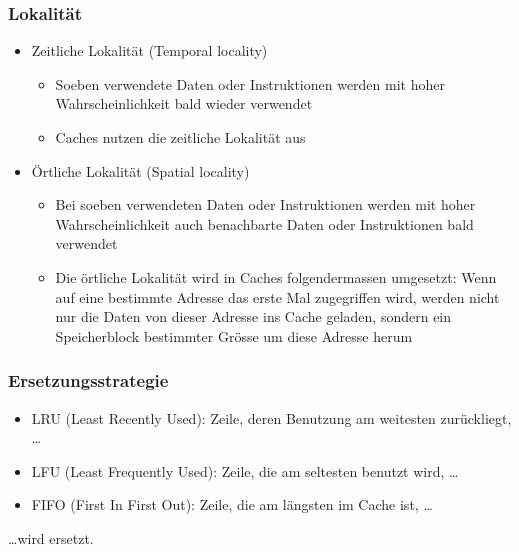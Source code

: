 \subsubsection{Lokalität}
\begin{minipage}[t]{6cm}
	\begin{itemize}
		\item Zeitliche Lokalität (Temporal locality)
		\begin{itemize}
			\item Soeben verwendete Daten oder Instruktionen werden mit hoher Wahrscheinlichkeit bald wieder verwendet
			\item Caches nutzen die zeitliche Lokalität aus
		\end{itemize}
	\end{itemize}
\end{minipage}
\begin{minipage}[t]{13cm}
	\begin{itemize}
		\item Örtliche Lokalität (Spatial locality)
		\begin{itemize}
			\item Bei soeben verwendeten Daten oder Instruktionen werden mit hoher Wahrscheinlichkeit auch benachbarte Daten oder Instruktionen bald verwendet
			\item Die örtliche Lokalität wird in Caches folgendermassen umgesetzt: Wenn auf eine bestimmte Adresse das erste Mal zugegriffen wird, werden nicht nur die Daten von dieser Adresse ins Cache geladen, sondern ein Speicherblock bestimmter Grösse um diese Adresse herum
		\end{itemize}
	\end{itemize}
\end{minipage}
\subsubsection{Ersetzungsstrategie}
\begin{itemize}
	\item LRU (Least Recently Used): Zeile, deren Benutzung am weitesten zur\"uckliegt, \ldots
	\item LFU (Least Frequently Used): Zeile, die am seltesten benutzt wird, \ldots
	\item FIFO (First In First Out): Zeile, die am längsten im Cache ist, \ldots
\end{itemize}
\ldots wird ersetzt.
